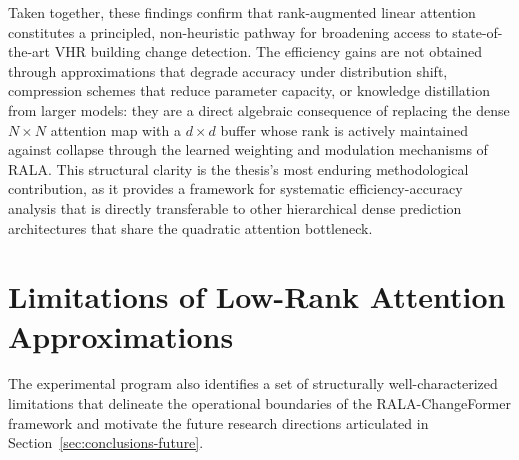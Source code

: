 Taken together, these findings confirm that rank-augmented linear attention constitutes a principled, non-heuristic pathway for broadening access to state-of-the-art \ac{VHR} building change detection. The efficiency gains are not obtained through approximations that degrade accuracy under distribution shift, compression schemes that reduce parameter capacity, or knowledge distillation from larger models: they are a direct algebraic consequence of replacing the dense $N \times N$ attention map with a $d \times d$ buffer whose rank is actively maintained against collapse through the learned weighting and modulation mechanisms of \ac{RALA}. This structural clarity is the thesis's most enduring methodological contribution, as it provides a framework for systematic efficiency-accuracy analysis that is directly transferable to other hierarchical dense prediction architectures that share the quadratic attention bottleneck.


\section{Limitations of Low-Rank Attention Approximations}
\label{sec:conclusions-limitations}

The experimental program also identifies a set of structurally well-characterized limitations that delineate the operational boundaries of the RALA-ChangeFormer framework and motivate the future research directions articulated in Section~\ref{sec:conclusions-future}.

